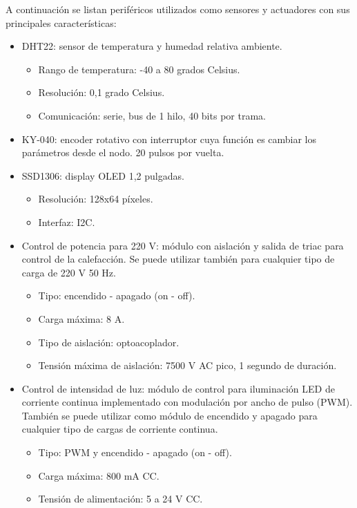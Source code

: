 A continuación se listan periféricos utilizados como sensores y actuadores con sus principales características:
\begin{itemize}
	\item DHT22: sensor de temperatura y humedad relativa ambiente.
	\begin{itemize}
		\item Rango de temperatura: -40 a 80 grados Celsius.
		\item Resolución: 0,1 grado Celsius.
		\item Comunicación: serie, bus de 1 hilo, 40 bits por trama.
	\end{itemize}
	\item KY-040: encoder rotativo con interruptor cuya función es cambiar los parámetros desde el nodo. 20 pulsos por vuelta.
	\item SSD1306: display OLED 1,2 pulgadas.
	\begin{itemize}
		\item Resolución: 128x64 píxeles.
		\item Interfaz: I2C.
	\end{itemize}
	\item Control de potencia para 220 V: módulo con aislación y salida de triac para control de la calefacción. Se puede utilizar también para cualquier tipo de carga de 220 V 50 Hz.
	\begin{itemize}
		\item Tipo: encendido - apagado (on - off).
		\item Carga máxima: 8 A.
		\item Tipo de aislación: optoacoplador.
		\item Tensión máxima de aislación: 7500 V AC pico, 1 segundo de duración.
	\end{itemize}
	\item Control de intensidad de luz: módulo de control para iluminación LED de corriente continua implementado con modulación por ancho de pulso (PWM). También se puede utilizar como módulo de encendido y apagado para cualquier tipo de cargas de corriente continua.
	\begin{itemize}
		\item Tipo: PWM y encendido - apagado (on - off).
		\item Carga máxima: 800 mA CC.
		\item Tensión de alimentación: 5 a 24 V CC.
	\end{itemize}
\end{itemize}


